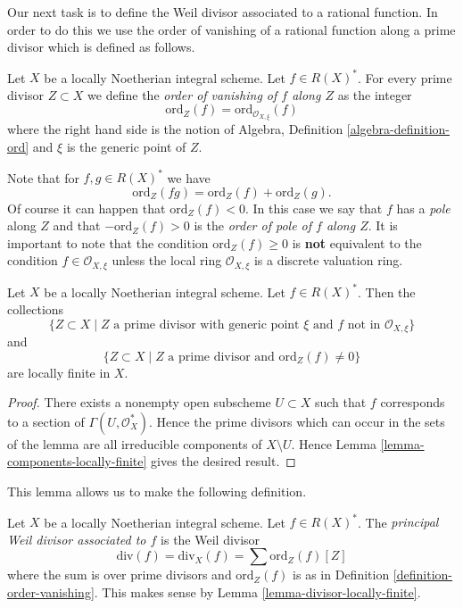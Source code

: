 \noindent
Our next task is to define the Weil divisor associated to a rational
function. In order to do this we use the order of vanishing of a
rational function along a prime divisor which is defined as follows.

\begin{definition}
\label{definition-order-vanishing}
Let $X$ be a locally Noetherian integral scheme. Let $f \in R(X)^*$.
For every prime divisor $Z \subset X$ we define the
{\it order of vanishing of $f$ along $Z$} as the integer
$$
\text{ord}_Z(f) = \text{ord}_{\mathcal{O}_{X, \xi}}(f)
$$
where the right hand side is the notion of
Algebra, Definition \ref{algebra-definition-ord}
and $\xi$ is the generic point of $Z$.
\end{definition}

\noindent
Note that for $f, g \in R(X)^*$ we have
$$
\text{ord}_Z(fg) = \text{ord}_Z(f) + \text{ord}_Z(g).
$$
Of course it can happen that $\text{ord}_Z(f) < 0$.
In this case we say that $f$ has a {\it pole} along $Z$
and that $-\text{ord}_Z(f) > 0$ is the
{\it order of pole of $f$ along $Z$}. It is important to note
that the condition $\text{ord}_Z(f) \geq 0$ is {\bf not} equivalent
to the condition $f \in \mathcal{O}_{X, \xi}$ unless the local
ring $\mathcal{O}_{X, \xi}$ is a discrete valuation ring.

\begin{lemma}
\label{lemma-divisor-locally-finite}
Let $X$ be a locally Noetherian integral scheme. Let $f \in R(X)^*$.
Then the collections
$$
\{Z \subset X \mid Z\text{ a prime divisor with generic point }\xi
\text{ and }f\text{ not in }\mathcal{O}_{X, \xi}\}
$$
and
$$
\{Z \subset X \mid Z \text{ a prime divisor and }\text{ord}_Z(f) \not = 0\}
$$
are locally finite in $X$.
\end{lemma}

\begin{proof}
There exists a nonempty open subscheme $U \subset X$ such that $f$
corresponds to a section of $\Gamma(U, \mathcal{O}_X^*)$. Hence the
prime divisors which can occur in the sets of the lemma are all
irreducible components of $X \setminus U$.
Hence Lemma \ref{lemma-components-locally-finite} gives the desired result.
\end{proof}

\noindent
This lemma allows us to make the following definition.

\begin{definition}
\label{definition-principal-divisor}
Let $X$ be a locally Noetherian integral scheme. Let $f \in R(X)^*$.
The {\it principal Weil divisor associated to $f$} is the Weil divisor
$$
\text{div}(f) = \text{div}_X(f) = \sum \text{ord}_Z(f) [Z]
$$
where the sum is over prime divisors and $\text{ord}_Z(f)$ is as in
Definition \ref{definition-order-vanishing}. This makes sense
by Lemma \ref{lemma-divisor-locally-finite}.
\end{definition}

